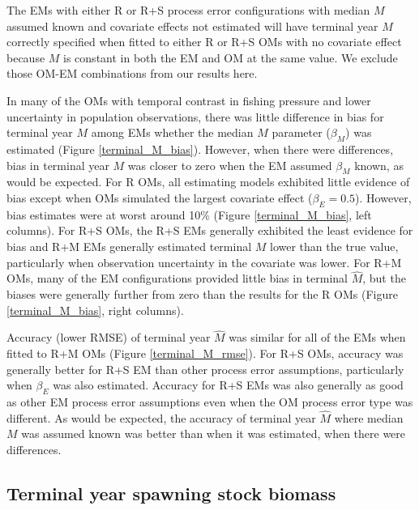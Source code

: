\documentclass[
  12pt,
]{article}
\begin{document}
The EMs with either R or R+S process error configurations with median \(M\) assumed known and covariate effects not estimated will have terminal year \(M\) correctly specified when fitted to either R or R+S OMs with no covariate effect because \(M\) is constant in both the EM and OM at the same value. We exclude those OM-EM combinations from our results here.

In many of the OMs with temporal contrast in fishing pressure and lower uncertainty in population observations, there was little difference in bias for terminal year \(M\) among EMs whether the median \(M\) parameter (\(\beta_M\)) was estimated (Figure \ref{terminal_M_bias}). However, when there were differences, bias in terminal year \(M\) was closer to zero when the EM assumed \(\beta_M\) known, as would be expected. For R OMs, all estimating models exhibited little evidence of bias except when OMs simulated the largest covariate effect (\(\beta_E = 0.5\)). However, bias estimates were at worst around 10\% (Figure \ref{terminal_M_bias}, left columns). For R+S OMs, the R+S EMs generally exhibited the least evidence for bias and R+M EMs generally estimated terminal \(M\) lower than the true value, particularly when observation uncertainty in the covariate was lower. For R+M OMs, many of the EM configurations provided little bias in terminal \(\widehat M\), but the biases were generally further from zero than the results for the R OMs (Figure \ref{terminal_M_bias}, right columns).

Accuracy (lower RMSE) of terminal year \(\widehat M\) was similar for all of the EMs when fitted to R+M OMs (Figure \ref{terminal_M_rmse}). For R+S OMs, accuracy was generally better for R+S EM than other process error assumptions, particularly when \(\beta_E\) was also estimated. Accuracy for R+S EMs was also generally as good as other EM process error assumptions even when the OM process error type was different. As would be expected, the accuracy of terminal year \(\widehat M\) where median \(M\) was assumed known was better than when it was estimated, when there were differences.

\hypertarget{terminal-year-spawning-stock-biomass}{%
\subsection*{Terminal year spawning stock biomass}\label{terminal-year-spawning-stock-biomass}}
\end{document}
